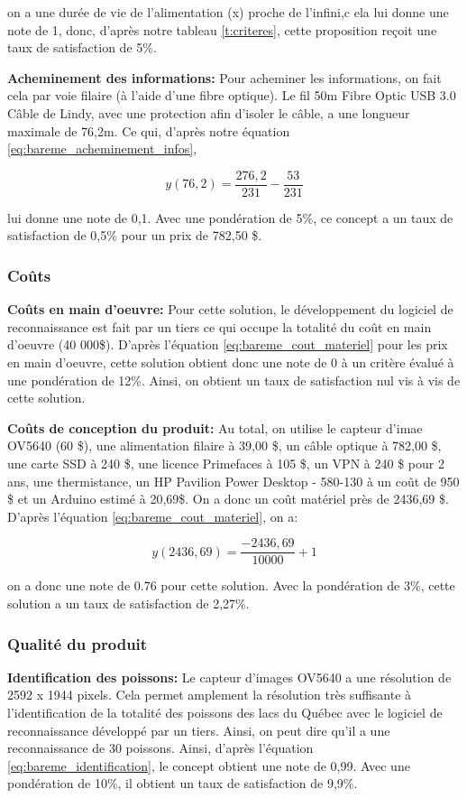 on a une durée de vie de l'alimentation (x) proche de l'infini,c ela lui donne une note de 1, donc, d'après notre tableau \ref{t:criteres}, cette proposition reçoit une taux de satisfaction de 5\%.

\textbf{Acheminement des informations:}
Pour acheminer les informations, on fait cela par voie filaire (à l'aide d'une fibre optique). Le fil 50m Fibre Optic USB 3.0 Câble de Lindy, avec une protection afin d'isoler le câble, a une longueur maximale de 76,2m. Ce qui, d'après notre équation \ref{eq:bareme_acheminement_infos},

\begin{equation}
    y(76,2) = 
        \frac{276,2}{231} - \frac{53}{231}
\end{equation}

lui donne une note de 0,1. Avec une pondération de 5\%, ce concept a un taux de satisfaction de 0,5\% pour un prix de 782,50 \$.

\subsubsection{Coûts}
\textbf{Coûts en main d'oeuvre:}
Pour cette solution, le développement du logiciel de reconnaissance est fait par un tiers ce qui occupe la totalité du coût en main d'oeuvre (40 000\$). D'après l'équation \ref{eq:bareme_cout_materiel} pour les prix en main d'oeuvre, cette solution obtient donc une note de 0 à un critère évalué à une pondération de 12\%. Ainsi, on obtient un taux de satisfaction nul vis à vis de cette solution.

\textbf{Coûts de conception du produit:}
Au total, on utilise le capteur d'imae OV5640 (60 \$), une alimentation filaire à 39,00 \$, un câble optique à 782,00 \$, une carte SSD à 240 \$, une licence Primefaces à 105 \$, un VPN à 240 \$ pour 2 ans, une thermistance, un HP Pavilion Power Desktop - 580-130 à un coût de 950 \$ et un Arduino estimé à 20,69\$. On a donc un coût matériel près de 2436,69 \$. D'après l'équation \ref{eq:bareme_cout_materiel}, on a:

\begin{equation}
y(2436,69) =  \frac{-2436,69}{10000} +1 \end{equation}

on a donc une note de 0.76 pour cette solution. Avec la pondération de 3\%, cette solution a un taux de satisfaction de 2,27\%.

\subsubsection{Qualité du produit}
\textbf{Identification des poissons:}
Le capteur d'images OV5640 a une résolution de 2592 x 1944 pixels. Cela permet amplement la résolution très suffisante à l'identification de la totalité des poissons des lacs du Québec avec le logiciel de reconnaissance développé par un tiers. Ainsi, on peut dire qu'il a une reconnaissance de 30 poissons. Ainsi, d'après l'équation \ref{eq:bareme_identification}, le concept obtient une note de 0,99. Avec une pondération de 10\%, il obtient un taux de satisfaction de 9,9\%.

